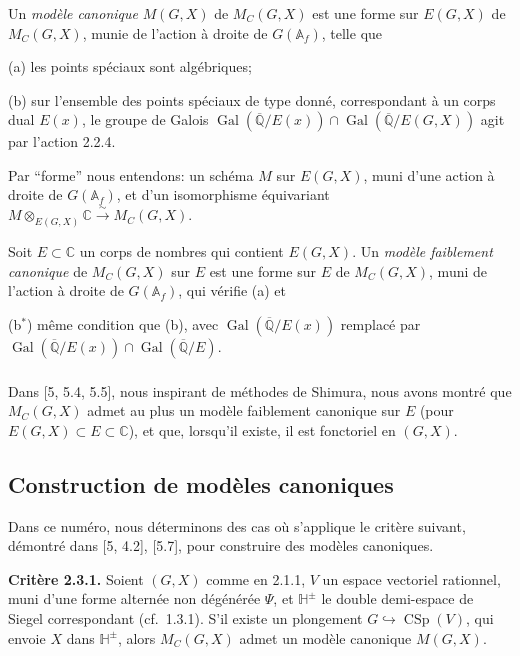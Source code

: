 \documentclass[12pt,a4paper]{article}
\theoremstyle{plain}
\theoremstyle{definition}
\theoremstyle{remark}
\DeclareMathOperator{\CSp}{CSp}
\DeclareMathOperator{\Gal}{Gal}
\newcommand{\QQ}{\mathbb{Q}}
\newcommand{\CC}{\mathbb{C}}
\newcommand{\HH}{\mathbb{H}}
\newcommand{\Af}{\mathbb{A}_f}
\newcommand{\simto}{\xrightarrow{\sim}}
\begin{document}
\subsubsection{}

Un \textit{mod\`ele canonique} $M(G,X)$ de $M_C(G,X)$ est une forme sur $E(G,X)$ de $M_C(G,X)$, munie de l'action \`a droite de $G(\Af)$, telle que

(a) les points sp\'eciaux sont alg\'ebriques;

(b) sur l'ensemble des points sp\'eciaux de type donn\'e, correspondant \`a un corps dual $E(x)$, le groupe de Galois $\Gal(\overline{\QQ}/E(x)) \cap \Gal(\overline{\QQ}/E(G,X))$ agit par l'action 2.2.4.

Par ``forme'' nous entendons: un sch\'ema $M$ sur $E(G,X)$, muni d'une action \`a droite de $G(\Af)$, et d'un isomorphisme \'equivariant $M \otimes_{E(G,X)} \CC \simto M_C(G,X)$.

Soit $E \subset \CC$ un corps de nombres qui contient $E(G,X)$. Un \textit{mod\`ele faiblement canonique} de $M_C(G,X)$ sur $E$ est une forme sur $E$ de $M_C(G,X)$, muni de l'action \`a droite de $G(\Af)$, qui v\'erifie (a) et

(b$^*$) m\^eme condition que (b), avec $\Gal(\overline{\QQ}/E(x))$ remplac\'e par $\Gal(\overline{\QQ}/E(x)) \cap \Gal(\overline{\QQ}/E)$.

\subsubsection{}

Dans [5, 5.4, 5.5], nous inspirant de m\'ethodes de Shimura, nous avons montr\'e que $M_C(G,X)$ admet au plus un mod\`ele faiblement canonique sur $E$ (pour $E(G,X) \subset E \subset \CC$), et que, lorsqu'il existe, il est fonctoriel en $(G,X)$.

\subsection{Construction de mod\`eles canoniques}

Dans ce num\'ero, nous d\'eterminons des cas o\`u s'applique le crit\`ere suivant, d\'emontr\'e dans [5, 4.2], [5.7], pour construire des mod\`eles canoniques.

\textbf{Crit\`ere 2.3.1.} Soient $(G,X)$ comme en 2.1.1, $V$ un espace vectoriel rationnel, muni d'une forme altern\'ee non d\'eg\'en\'er\'ee $\Psi$, et $\HH^{\pm}$ le double demi-espace de Siegel correspondant (cf.~1.3.1). S'il existe un plongement $G \hookrightarrow \CSp(V)$, qui envoie $X$ dans $\HH^{\pm}$, alors $M_C(G,X)$ admet un mod\`ele canonique $M(G,X)$.
\end{document}
